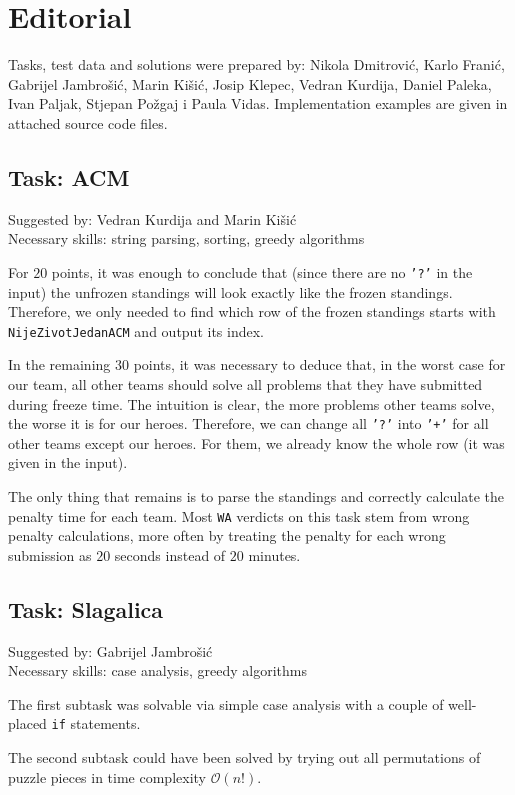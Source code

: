 \documentclass[a4paper]{article}
\begin{document}
\section*{Editorial}
Tasks, test data and solutions were prepared by: Nikola Dmitrović, Karlo Franić,
Gabrijel Jambrošić, Marin Kišić, Josip Klepec, Vedran Kurdija, Daniel Paleka,
Ivan Paljak, Stjepan Požgaj i Paula Vidas. Implementation examples are given
in attached source code files.

\subsection*{Task: ACM}
\textsf{Suggested by: Vedran Kurdija and Marin Kišić}\\
\textsf{Necessary skills: string parsing, sorting, greedy algorithms}

For $20$ points, it was enough to conclude that (since there are no \texttt{'?'}
in the input) the unfrozen standings will look exactly like the frozen
standings. Therefore, we only needed to find which row of the frozen standings
starts with \texttt{NijeZivotJedanACM} and output its index.

In the remaining $30$ points, it was necessary to deduce that, in the worst case
for our team, all other teams should solve all problems that they have submitted
during freeze time. The intuition is clear, the more problems other teams solve,
the worse it is for our heroes. Therefore, we can change all \texttt{'?'} into
\texttt{'+'} for all other teams except our heroes. For them, we already know
the whole row (it was given in the input).

The only thing that remains is to parse the standings and correctly calculate
the penalty time for each team. Most \texttt{WA} verdicts on this task stem
from wrong penalty calculations, more often by treating the penalty for each
wrong submission as $20$ seconds instead of $20$ minutes.

\subsection*{Task: Slagalica}
\textsf{Suggested by: Gabrijel Jambrošić}\\
\textsf{Necessary skills: case analysis, greedy algorithms}

The first subtask was solvable via simple case analysis with a couple of
well-placed \texttt{if} statements.

The second subtask could have been solved by trying out all permutations
of puzzle pieces in time complexity $\mathcal{O}(n!)$.
\end{document}
